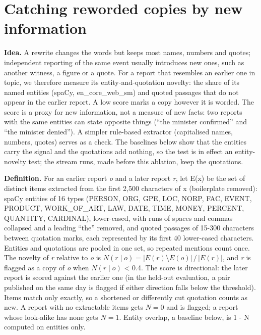 \section{Catching reworded copies by new information}\label{sec:novelty}

\textbf{Idea.} A rewrite changes the words but keeps most names, numbers and quotes; independent reporting of the same event usually introduces new ones, such as another witness, a figure or a quote. For a report that resembles an earlier one in topic, we therefore measure its entity-and-quotation novelty: the share of its named entities (spaCy, en\_core\_web\_sm) and quoted passages that do not appear in the earlier report. A low score marks a copy however it is worded. The score is a proxy for new information, not a measure of new facts: two reports with the same entities can state opposite things (``the minister confirmed'' and ``the minister denied''). A simpler rule-based extractor (capitalised names, numbers, quotes) serves as a check. The baselines below show that the entities carry the signal and the quotations add nothing, so the test is in effect an entity-novelty test; the stream runs, made before this ablation, keep the quotations.

\textbf{Definition.} For an earlier report \emph{o} and a later report \emph{r}, let E(x) be the set of distinct items extracted from the first 2,500 characters of x (boilerplate removed): spaCy entities of 16 types (PERSON, ORG, GPE, LOC, NORP, FAC, EVENT, PRODUCT, WORK\_OF\_ART, LAW, DATE, TIME, MONEY, PERCENT, QUANTITY, CARDINAL), lower-cased, with runs of spaces and commas collapsed and a leading ``the'' removed, and quoted passages of 15-300 characters between quotation marks, each represented by its first 40 lower-cased characters. Entities and quotations are pooled in one set, so repeated mentions count once. The novelty of \emph{r} relative to \emph{o} is \(N(r\mid o)=|E(r)\setminus E(o)|\,/\,|E(r)|\), and \emph{r} is flagged as a copy of \emph{o} when \(N(r\mid o)\) \textless{} 0.4. The score is directional: the later report is scored against the earlier one (in the held-out evaluation, a pair published on the same day is flagged if either direction falls below the threshold). Items match only exactly, so a shortened or differently cut quotation counts as new. A report with no extractable items gets \(N=0\) and is flagged; a report whose look-alike has none gets \(N=1\). Entity overlap, a baseline below, is 1 - N computed on entities only.

